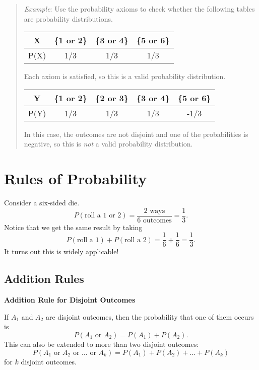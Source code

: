 \documentclass[
]{book}
\begin{document}
\begin{quote}
\emph{Example}: Use the probability axioms to check whether the following tables are probability distributions.

\begin{longtable}[]{@{}cccc@{}}
\toprule
X & \{1 or 2\} & \{3 or 4\} & \{5 or 6\} \\
\midrule
\endhead
P(X) & 1/3 & 1/3 & 1/3 \\
\bottomrule
\end{longtable}

Each axiom is satisfied, so this is a valid probability distribution.

\begin{longtable}[]{@{}ccccc@{}}
\toprule
Y & \{1 or 2\} & \{2 or 3\} & \{3 or 4\} & \{5 or 6\} \\
\midrule
\endhead
P(Y) & 1/3 & 1/3 & 1/3 & -1/3 \\
\bottomrule
\end{longtable}

In this case, the outcomes are not disjoint and one of the probabilities is negative, so this is \emph{not} a valid probability distribution.
\end{quote}

\hypertarget{rules-of-probability}{%
\section{Rules of Probability}\label{rules-of-probability}}

Consider a six-sided die. \[P(\text{roll a 1 or 2}) = \frac{\text{2 ways}}{\text{6 outcomes}} = \frac{1}{3}.\] Notice that we get the same result by taking \[P(\text{roll a 1})+P(\text{roll a 2}) = \frac{1}{6}+\frac{1}{6} = \frac{1}{3}.\] It turns out this is widely applicable!

\hypertarget{addition-rules}{%
\subsection{Addition Rules}\label{addition-rules}}

\textbf{Addition Rule for Disjoint Outcomes}

If \(A_1\) and \(A_2\) are disjoint outcomes, then the probability that one of them occurs is \[P(A_1 \text{ or } A_2) = P(A_1)+P(A_2).\] This can also be extended to more than two disjoint outcomes: \[P(A_1 \text{ or } A_2 \text{ or } \dots \text{ or } A_k) = P(A_1)+P(A_2)+\dots + P(A_k)\] for \(k\) disjoint outcomes.
\end{document}
